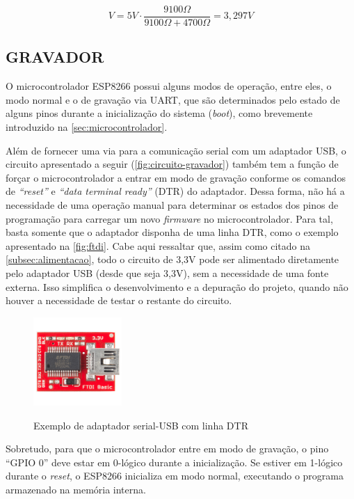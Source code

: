 \begin{equation}
    V = 5V \cdot \frac{9100\Omega}{9100\Omega+4700\Omega} = 3,297V
    \label{eq:5v-3v3}
\end{equation}

\subsection{GRAVADOR}
\label{subsec:gravador}

O microcontrolador ESP8266 possui alguns modos de operação, entre eles, o modo normal e o de gravação via UART, que são determinados pelo estado de alguns pinos durante a inicialização do sistema (\emph{boot}), como brevemente introduzido na \autoref{sec:microcontrolador}.

Além de fornecer uma via para a comunicação serial com um adaptador USB, o circuito apresentado a seguir (\autoref{fig:circuito-gravador}) também tem a função de forçar o microcontrolador a entrar em modo de gravação conforme os comandos de \emph{``reset''} e \emph{``data terminal ready''} (DTR) do adaptador. Dessa forma, não há a necessidade de uma operação manual para determinar os estados dos pinos de programação para carregar um novo \emph{firmware} no microcontrolador. Para tal, basta somente que o adaptador disponha de uma linha DTR, como o exemplo apresentado na \autoref{fig:ftdi}. Cabe aqui ressaltar que, assim como citado na \autoref{subsec:alimentacao}, todo o circuito de 3,3V pode ser alimentado diretamente pelo adaptador USB (desde que seja 3,3V), sem a necessidade de uma fonte externa. Isso simplifica o desenvolvimento e a depuração do projeto, quando não houver a necessidade de testar o restante do circuito.

\begin{figure}[H]
    \centering
    \caption{Exemplo de adaptador serial-USB com linha DTR}
    \includegraphics[width=0.3\textwidth]{./dados/figuras/ftdi}
    \label{fig:ftdi}
\end{figure}

Sobretudo, para que o microcontrolador entre em modo de gravação, o pino ``GPIO 0'' deve estar em 0-lógico durante a inicialização. Se estiver em 1-lógico durante o \emph{reset}, o ESP8266 inicializa em modo normal, executando o programa armazenado na memória interna.

